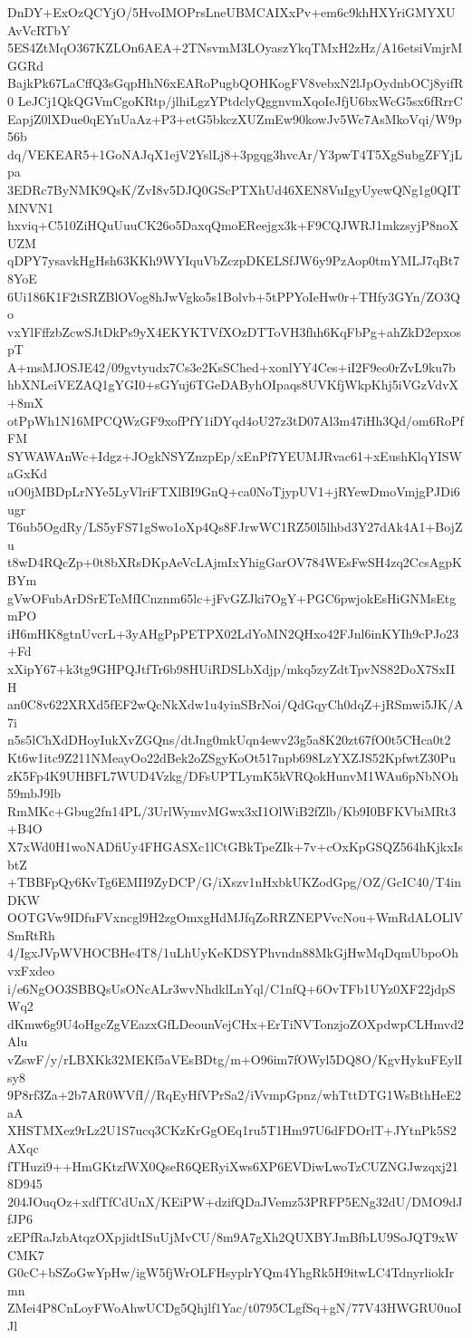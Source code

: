 DnDY+ExOzQCYjO/5HvoIMOPrsLneUBMCAIXxPv+em6c9khHXYriGMYXUAvVcRTbY
5ES4ZtMqO367KZLOn6AEA+2TNsvmM3LOyaszYkqTMxH2zHz/A16etsiVmjrMGGRd
BajkPk67LaCffQ3sGqpHhN6xEARoPugbQOHKogFV8vebxN2lJpOydnbOCj8yifR0
LeJCj1QkQGVmCgoKRtp/jlhiLgzYPtdclyQggnvmXqoIeJfjU6bxWcG5sx6fRrrC
EapjZ0lXDue0qEYnUaAz+P3+etG5bkczXUZmEw90kowJv5Wc7AsMkoVqi/W9p56b
dq/VEKEAR5+1GoNAJqX1ejV2YslLj8+3pgqg3hvcAr/Y3pwT4T5XgSubgZFYjLpa
3EDRc7ByNMK9QsK/ZvI8v5DJQ0GScPTXhUd46XEN8VuIgyUyewQNg1g0QITMNVN1
hxviq+C510ZiHQuUuuCK26o5DaxqQmoEReejgx3k+F9CQJWRJ1mkzsyjP8noXUZM
qDPY7ysavkHgHsh63KKh9WYIquVbZczpDKELSfJW6y9PzAop0tmYMLJ7qBt78YoE
6Ui186K1F2tSRZBlOVog8hJwVgko5s1Bolvb+5tPPYoIeHw0r+THfy3GYn/ZO3Qo
vxYlFffzbZcwSJtDkPs9yX4EKYKTVfXOzDTToVH3fhh6KqFbPg+ahZkD2epxospT
A+msMJOSJE42/09gvtyudx7Cs3e2KsSChed+xonlYY4Ces+iI2F9eo0rZvL9ku7b
hbXNLeiVEZAQ1gYGI0+sGYuj6TGeDAByhOIpaqs8UVKfjWkpKhj5iVGzVdvX+8mX
otPpWh1N16MPCQWzGF9xofPfY1iDYqd4oU27z3tD07Al3m47iHh3Qd/om6RoPfFM
SYWAWAnWc+Idgz+JOgkNSYZnzpEp/xEnPf7YEUMJRvac61+xEushKlqYISWaGxKd
uO0jMBDpLrNYe5LyVlriFTXlBI9GnQ+ca0NoTjypUV1+jRYewDmoVmjgPJDi6ugr
T6ub5OgdRy/LS5yFS71gSwo1oXp4Qs8FJrwWC1RZ50l5lhbd3Y27dAk4A1+BojZu
t8wD4RQcZp+0t8bXRsDKpAeVcLAjmIxYhigGarOV784WEsFwSH4zq2CcsAgpKBYm
gVwOFubArDSrETeMfICnznm65lc+jFvGZJki7OgY+PGC6pwjokEsHiGNMsEtgmPO
iH6mHK8gtnUvcrL+3yAHgPpPETPX02LdYoMN2QHxo42FJnl6inKYIh9cPJo23+Fd
xXipY67+k3tg9GHPQJtfTr6b98HUiRDSLbXdjp/mkq5zyZdtTpvNS82DoX7SxIIH
an0C8v622XRXd5fEF2wQcNkXdw1u4yinSBrNoi/QdGqyCh0dqZ+jRSmwi5JK/A7i
n5s5lChXdDHoyIukXvZGQns/dtJng0mkUqn4ewv23g5a8K20zt67fO0t5CHca0t2
Kt6w1itc9Z211NMeayOo22dBek2oZSgyKoOt517npb698LzYXZJS52KpfwtZ30Pu
zK5Fp4K9UHBFL7WUD4Vzkg/DFsUPTLymK5kVRQokHunvM1WAu6pNbNOh59mbJ9lb
RmMKc+Gbug2fn14PL/3UrlWymvMGwx3xI1OlWiB2fZlb/Kb9I0BFKVbiMRt3+B4O
X7xWd0H1woNADfiUy4FHGASXc1lCtGBkTpeZIk+7v+cOxKpGSQZ564hKjkxIsbtZ
+TBBFpQy6KvTg6EMII9ZyDCP/G/iXszv1nHxbkUKZodGpg/OZ/GcIC40/T4inDKW
OOTGVw9IDfuFVxncgl9H2zgOmxgHdMJfqZoRRZNEPVvcNou+WmRdALOLlVSmRtRh
4/IgxJVpWVHOCBHe4T8/1uLhUyKeKDSYPhvndn88MkGjHwMqDqmUbpoOhvxFxdeo
i/e6NgOO3SBBQsUsONcALr3wvNhdklLnYql/C1nfQ+6OvTFb1UYz0XF22jdpSWq2
dKmw6g9U4oHgcZgVEazxGfLDeounVejCHx+ErTiNVTonzjoZOXpdwpCLHmvd2Alu
vZswF/y/rLBXKk32MEKf5aVEsBDtg/m+O96im7fOWyl5DQ8O/KgvHykuFEylIsy8
9P8rf3Za+2b7AR0WVfI//RqEyHfVPrSa2/iVvmpGpnz/whTttDTG1WsBthHeE2aA
XHSTMXez9rLz2U1S7ucq3CKzKrGgOEq1ru5T1Hm97U6dFDOrlT+JYtnPk5S2AXqc
fTHuzi9++HmGKtzfWX0QseR6QERyiXws6XP6EVDiwLwoTzCUZNGJwzqxj218D945
204JOuqOz+xdfTfCdUnX/KEiPW+dzifQDaJVemz53PRFP5ENg32dU/DMO9dJfJP6
zEPfRaJzbAtqzOXpjidtISuUjMvCU/8m9A7gXh2QUXBYJmBfbLU9SoJQT9xWCMK7
G0cC+bSZoGwYpHw/igW5fjWrOLFHsyplrYQm4YhgRk5H9itwLC4TdnyrliokIrmn
ZMei4P8CnLoyFWoAhwUCDg5Qhjlf1Yac/t0795CLgfSq+gN/77V43HWGRU0uoIJl
